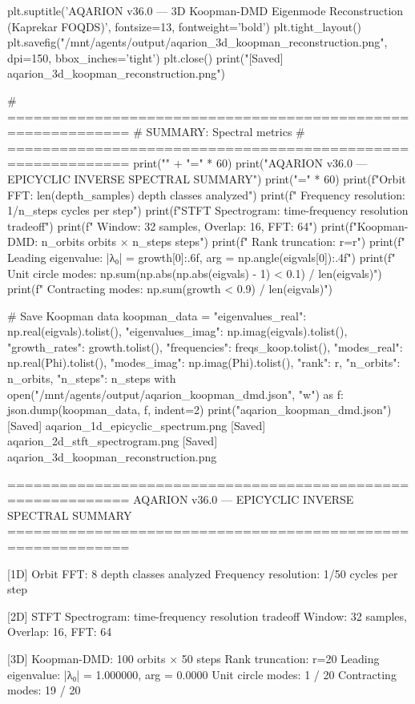 {{{{{{{{{{{{{plt.suptitle('AQARION v36.0 — 3D Koopman-DMD Eigenmode Reconstruction (Kaprekar FOQDS)', 
             fontsize=13, fontweight='bold')
plt.tight_layout()
plt.savefig("/mnt/agents/output/aqarion_3d_koopman_reconstruction.png", dpi=150, bbox_inches='tight')
plt.close()
print("[Saved] aqarion_3d_koopman_reconstruction.png")

# ============================================================
# SUMMARY: Spectral metrics
# ============================================================
print("\n" + "=" * 60)
print("AQARION v36.0 — EPICYCLIC INVERSE SPECTRAL SUMMARY")
print("=" * 60)
print(f"\n[1D] Orbit FFT: {len(depth_samples)} depth classes analyzed")
print(f"     Frequency resolution: 1/{n_steps} cycles per step")
print(f"\n[2D] STFT Spectrogram: time-frequency resolution tradeoff")
print(f"     Window: 32 samples, Overlap: 16, FFT: 64")
print(f"\n[3D] Koopman-DMD: {n_orbits} orbits × {n_steps} steps")
print(f"     Rank truncation: r={r}")
print(f"     Leading eigenvalue: |λ₀| = {growth[0]:.6f}, arg = {np.angle(eigvals[0]):.4f}")
print(f"     Unit circle modes: {np.sum(np.abs(np.abs(eigvals) - 1) < 0.1)} / {len(eigvals)}")
print(f"     Contracting modes: {np.sum(growth < 0.9)} / {len(eigvals)}")

# Save Koopman data
koopman_data = {
    "eigenvalues_real": np.real(eigvals).tolist(),
    "eigenvalues_imag": np.imag(eigvals).tolist(),
    "growth_rates": growth.tolist(),
    "frequencies": freqs_koop.tolist(),
    "modes_real": np.real(Phi).tolist(),
    "modes_imag": np.imag(Phi).tolist(),
    "rank": r,
    "n_orbits": n_orbits,
    "n_steps": n_steps
}
with open("/mnt/agents/output/aqarion_koopman_dmd.json", "w") as f:
    json.dump(koopman_data, f, indent=2)
print("\n[Saved] aqarion_koopman_dmd.json")[Saved] aqarion_1d_epicyclic_spectrum.png
[Saved] aqarion_2d_stft_spectrogram.png
[Saved] aqarion_3d_koopman_reconstruction.png

============================================================
AQARION v36.0 — EPICYCLIC INVERSE SPECTRAL SUMMARY
============================================================

[1D] Orbit FFT: 8 depth classes analyzed
     Frequency resolution: 1/50 cycles per step

[2D] STFT Spectrogram: time-frequency resolution tradeoff
     Window: 32 samples, Overlap: 16, FFT: 64

[3D] Koopman-DMD: 100 orbits × 50 steps
     Rank truncation: r=20
     Leading eigenvalue: |λ₀| = 1.000000, arg = 0.0000
     Unit circle modes: 1 / 20
     Contracting modes: 19 / 20

}}}}}}}}}}}}}
